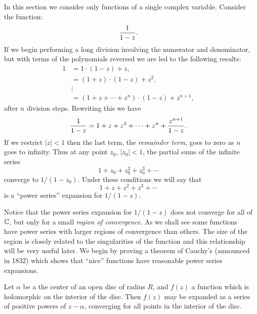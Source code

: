 In this section we consider only functions of a single 
complex variable.  Consider the function: 
\[
{1 \over 1 - z}.
\]
If we begin performing a long division involving the numerator and
denominator, but with terms of the polynomials reversed we are led to the
following results: 
\[
\begin{aligned}
  1& = 1  \cdot (1 - z) + z, \\
    &= (1+ z) \cdot (1 - z) + z^2, \\
    &\vdots \\
    &= (1 + z + \cdots + z^n) \cdot (1 - z) + z^{n+1},
\end{aligned}
\]
after $n$ division steps.  Rewriting this we have 
\[
\frac{1}{1 -z} = 1 + z + z^2 + \cdots + z^n + {z^{n+1} \over 1 - z}.
\]
If we restrict $|z|  < 1$ then the last term, the {\em remainder
term\/}, goes to zero as $n$ goes to infinity.  Thus at any point $z_0$,
$|z_0| < 1$, the partial sums of the infinite series 
\[
1 + z_0 + z_0^2 + z_0^3 + \cdots
\]
converge to $1/(1 - z_0)$.  Under these conditions we will say that 
\[
1 + z + z^2 + z^3 + \cdots
\]
is a ``power series'' expansion for $1/(1 - z)$.

Notice that the power series expansion for $1/(1 - z)$
does not converge for all of $\mathbb{C}$, but only for a small {\em region of 
convergence\/}.  As we shall see some functions have power series with larger
regions of convergence than others.  The size of the region
is closely related to the singularities of the function and this
relationship will be very useful later.  We begin by proving a theorem
of Cauchy's (announced in 1832) which shows that ``nice'' functions have
reasonable power series expansions. 

\begin{proposition}[Cauchy]
Let $\alpha$ be a the center of an open disc of radius $R$, and $f(z)$
a function which is holomorphic on the interior of the disc.  Then
$f(z)$ may be expanded as a series of positive powers of $z - \alpha$,
converging for all points in the interior of the disc.
\end{proposition}

